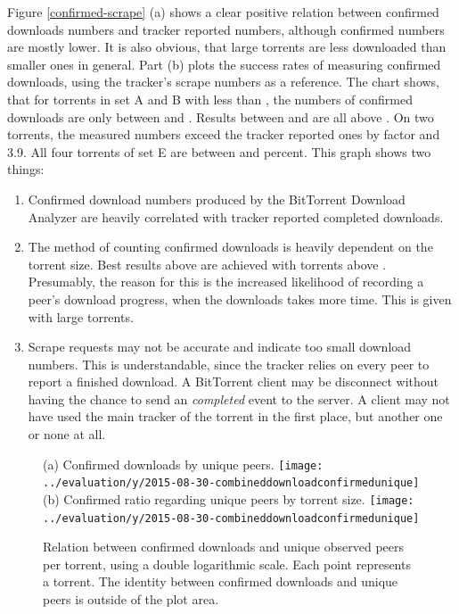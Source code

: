 \documentclass[10pt, a4paper, twoside, headsepline]{scrbook}
\renewcommand{\_}{\origunderscore\allowbreak}
\begin{document}
Figure \ref{confirmed-scrape} (a) shows a clear positive relation between confirmed downloads numbers and tracker reported numbers, although confirmed numbers are mostly lower. It is also obvious, that large torrents are less downloaded than smaller ones in general. Part (b) plots the success rates of measuring confirmed downloads, using the tracker's scrape numbers as a reference. The chart shows, that for torrents in set A and B with less than , the numbers of confirmed downloads are only between  and . Results between  and  are all above . On two torrents, the measured numbers exceed the tracker reported ones by factor  and {3.9}. All four torrents of set E are between  and  percent. This graph shows two things:
\begin{enumerate}
\item Confirmed download numbers produced by the BitTorrent Download Analyzer are heavily correlated with tracker reported completed downloads.
\item The method of counting confirmed downloads is heavily dependent on the torrent size. Best results above  are achieved with torrents above . Presumably, the reason for this is the increased likelihood of recording a peer's download progress, when the downloads takes more time. This is given with large torrents.
\item Scrape requests may not be accurate and indicate too small download numbers. This is understandable, since the tracker relies on every peer to report a finished download. A BitTorrent client may be disconnect without having the chance to send an \emph{completed} event to the server. A client may not have used the main tracker of the torrent in the first place, but another one or none at all.
\end{enumerate}

\begin{figure}
\centering
(a) Confirmed downloads by unique peers.
\texttt{[image: ../evaluation/y/2015-08-30\_20-combined\_download\_confirmed\_unique]}
(b) Confirmed ratio regarding unique peers by torrent size.
\texttt{[image: ../evaluation/y/2015-08-30\_20-combined\_download\_confirmed\_unique]}
\caption[Download numbers: Confirmed vs. unique peers]{Relation between confirmed downloads and unique observed peers per torrent, using a double logarithmic scale. Each point represents a torrent. The identity between confirmed downloads and unique peers is outside of the plot area.}
\label{confirmed-unique}
\end{figure}
\end{document}
